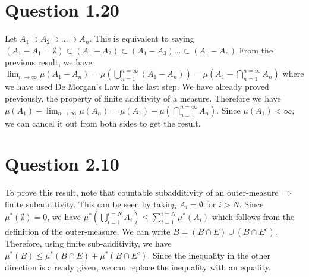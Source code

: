 \documentclass{article}
\begin{document}
  \section*{Question 1.20}
    Let $A_1 \supset A_2 \supset ... \supset A_n$. This is equivalent to saying $(A_1 - A_1= \emptyset) \subset (A_1 - A_2) \subset (A_1 - A_3)... \subset(A_1 - A_n)$
    From the previous result, we have $\lim_{n \rightarrow \infty}\mu(A_1 - A_n) = \mu(\bigcup_{n=1}^{n=\infty}(A_1 - A_n)) = \mu(A_1 - \bigcap_{n=1}^{n=\infty}A_n)$ where we have used De Morgan's Law
    in the last step. We have already proved previously, the property of finite additivity of a measure. Therefore we have
    $\mu(A_1) - \lim_{n \rightarrow \infty}\mu(A_n) = \mu(A_1) - \mu(\bigcap_{n=1}^{n=\infty}A_n)$. Since $\mu(A_1) < \infty$, we can cancel it out from both sides to get the result.

  \section*{Question 2.10}
    To prove this result, note that countable subadditivity of an outer-measure $\Rightarrow$ finite subadditivity. 
    \newline
    \newline
    This can be seen by taking $A_i = \emptyset$ for $i > N$. Since $\mu^*(\emptyset)= 0$, we have
    $\mu^*(\bigcup_{i=1}^{i=N}A_i) \le \sum_{i=1}^{i=N}\mu^*(A_i)$ which follows from the definition of the outer-measure.
    \newline
    \linebreak
    We can write $B = (B \cap E) \cup (B \cap E^c)$. Therefore, using finite sub-additivity, we have $\mu^*(B) \le \mu^*(B \cap E) + \mu^*(B \cap E^c)$. Since the inequality in the other direction
    is already given, we can replace the inequality with an equality.
\end{document}
